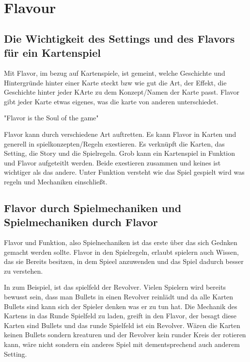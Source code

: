 
\section{Flavour}\label{sec:flavour}

\renewcommand{\kapitelautor}{Autor: Irgendwer} %

\subsection{Die Wichtigkeit des Settings und des Flavors für ein Kartenspiel}\label{subsec:wichtigkeit-des-flavours}

%
Mit Flavor, im bezug auf Kartenspiele, ist gemeint, welche Geschichte und Hintergründe hinter einer Karte steckt bzw wie gut die Art, der Effekt,
die Geschichte hinter jeder KArte zu dem Konzept/Namen der Karte passt. Flavor gibt jeder Karte etwas eigenes, was die karte von anderen unterschiedet.

"Flavor is the Soul of the game"\cite{soulOfTheGame}


Flavor kann durch verschiedene Art auftretten. Es kann Flavor in Karten und generell in spielkonzepten/Regeln exestieren.
Es verknüpft die Karten, das Setting, die Story und die Spielregeln. Grob kann ein Kartenspiel in Funktion und Flavor aufgeteitlt werden.
Beide exestieren zusammen und keines ist wichtiger als das andere. Unter Funktion versteht wie das Spiel gespielt wird was regeln und Mechaniken einschließt. \cite{flavorAndFunction}

%
\subsection{Flavor durch Spielmechaniken und Spielmechaniken durch Flavor}\label{subsec:flavour-durch-mechaniken}

Flavor und Funktion, also Spielnechaniken ist das erste über das sich Gednken gemacht werden sollte.
Flavor in den Spielregeln, erlaubt spielern auch Wissen, das sie Bereits besitzen, in dem Spieel anzuwenden und das Spiel dadurch besser zu verstehen. \cite{flavorAndFunction}


In \FF zum Beispiel, ist das spielfeld der Revolver. Vielen Spielern wird bereits bewusst sein, dass man Bullets in einen Revolver reinlädt und da alle Karten Bullets sind kann sich der Spieler
denken was er zu tun hat. Die Mechanik des Kartens in das Runde Spielfeld zu laden, greift in den Flavor, der besagt diese Karten sind Bullets und das runde Spielfeld ist ein Revolver.
Wären die Karten keinen Bullets sondern kreaturen und der Revolver kein runder Kreis der rotieren kann, wäre \FF nicht \FF sondern ein anderes Spiel mit dementsprechend auch anderem Setting.


